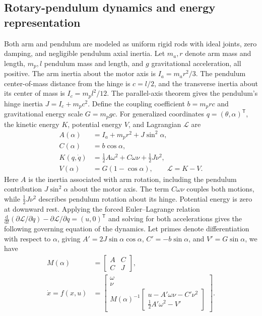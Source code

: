 \documentclass[letterpaper,10pt,conference]{ieeeconf}
\newcommand{\dd}{\mathrm{d}}
\begin{document}
\subsection{Rotary-pendulum dynamics and energy representation}
\label{sec:dynamics}
Both arm and pendulum are modeled as uniform rigid rods with ideal joints, zero damping, and negligible pendulum axial inertia. Let $m_a,r$ denote arm mass and length, $m_p,l$ pendulum mass and length, and $g$ gravitational acceleration, all positive. The arm inertia about the motor axis is $I_a=m_ar^2/3$. The pendulum center-of-mass distance from the hinge is $c=l/2$, and the transverse inertia about its center of mass is $I_c=m_pl^2/12$. The parallel-axis theorem gives the pendulum's hinge inertia $J=I_c+m_pc^2$. Define the coupling coefficient $b=m_prc$ and gravitational energy scale $G=m_pgc$. For generalized coordinates $q=(\theta,\alpha)^{\mathsf T}$, the kinetic energy $K$, potential energy $V$, and Lagrangian $\mathcal L$ are
\begin{equation}
\begin{aligned}
 A(\alpha)&=I_a+m_pr^2+J\sin^2\alpha,\\
 C(\alpha)&=b\cos\alpha,\\
 K(q,\dot q)&=\tfrac12A\omega^2+C\omega\nu+\tfrac12J\nu^2,\\
 V(\alpha)&=G(1-\cos\alpha),\qquad \mathcal L=K-V.
\end{aligned}
\label{eq:lagrangian}
\end{equation}
Here $A$ is the inertia associated with arm rotation, including the pendulum contribution $J\sin^2\alpha$ about the motor axis. The term $C\omega\nu$ couples both motions, while $\frac{1}{2}J\nu^2$ describes pendulum rotation about its hinge. Potential energy is zero at downward rest. Applying the forced Euler--Lagrange relation $\frac{\dd}{\dd t}(\partial\mathcal L/\partial\dot q)-\partial\mathcal L/\partial q=(u,0)^{\mathsf T}$ and solving for both accelerations gives the following governing equation of the dynamics. Let primes denote differentiation with respect to $\alpha$, giving $A'=2J\sin\alpha\cos\alpha$, $C'=-b\sin\alpha$, and $V'=G\sin\alpha$, we have 
\begin{equation}
\begin{aligned}
 M(\alpha)&=\begin{bmatrix}A&C\\C&J\end{bmatrix},\\
 \dot x=f(x,u)&=
 \begin{bmatrix}
 \omega\\
 \nu\\
 M(\alpha)^{-1}\!
 \begin{bmatrix}
 u-A'\omega\nu-C'\nu^2\\
 \tfrac12A'\omega^2-V'
 \end{bmatrix}
 \end{bmatrix}.
\end{aligned}
\label{eq:dynamics}
\end{equation}
\end{document}
